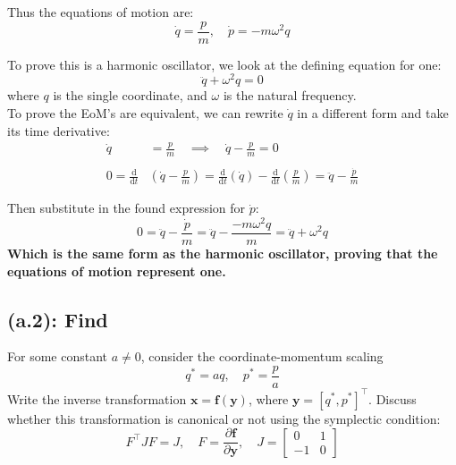 \documentclass[titlepage]{article}
\begin{document}
\begin{mdframed}[linewidth=1pt, innertopmargin=10pt, innerbottommargin=10pt]
	Thus the equations of motion are:
	\begin{equation}
		\dot{q}=\frac{p}{m},\quad\dot{p}=-m\omega^2q
	\end{equation}
\end{mdframed}

To prove this is a harmonic oscillator, we look at the defining equation for one:
\begin{equation}
	\ddot{q}+\omega^2q=0
\end{equation}
where $q$ is the single coordinate, and $\omega$ is the natural frequency.\\

To prove the EoM's are equivalent, we can rewrite $\dot{q}$ in a different form and take its time derivative:
\begin{equation}
	\begin{split}
		\dot{q}&=\frac{p}{m}\quad\implies\quad\dot{q}-\frac{p}{m}=0 \\
		\\
		0=\frac{\mathrm{d}}{\mathrm{d}t}&\left(\dot{q}-\frac{p}{m}\right)=\frac{\mathrm{d}}{\mathrm{d}t}\left(\dot{q}\right)-\frac{\mathrm{d}}{\mathrm{d}t}\left(\frac{p}{m}\right)=\ddot{q}-\frac{\dot{p}}{m}
	\end{split}
\end{equation}

\begin{mdframed}[linewidth=1pt, innertopmargin=10pt, innerbottommargin=10pt]
	Then substitute in the found expression for $\dot{p}$:
	\begin{equation}
		0=\ddot{q}-\frac{\dot{p}}{m}=\ddot{q}-\frac{-m\omega^2q}{m}=\ddot{q}+\omega^2q
	\end{equation}
	\textbf{Which is the same form as the harmonic oscillator, proving that the equations of motion represent one.}
\end{mdframed}

\subsection*{(a.2): Find}

For some constant $a\neq0$, consider the coordinate-momentum scaling
\begin{equation}
	q^*=aq,\quad p^*=\frac{p}{a}
	\label{eq:transformed}
\end{equation}
Write the inverse transformation $\boldsymbol{x}=\boldsymbol{f}(\boldsymbol{y})$, where $\boldsymbol{y}=[q^*,p^*]^\top$. Discuss whether this transformation is canonical or not using the symplectic condition:
\begin{equation}
	F^\top JF=J,\quad F=\frac{\partial\boldsymbol{f}}{\partial\boldsymbol{y}},\quad J=
	\begin{bmatrix}
		0 & 1 \\
		-1 & 0
	\end{bmatrix}
\end{equation}
\end{document}
